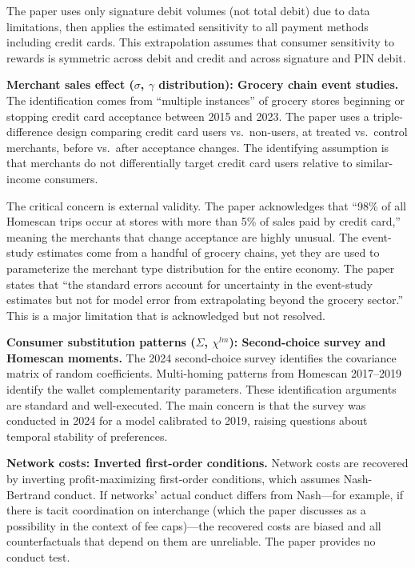 \documentclass[11pt]{article}
\begin{document}
The paper uses only signature debit volumes (not total debit) due to data limitations, then applies the estimated sensitivity to all payment methods including credit cards. This extrapolation assumes that consumer sensitivity to rewards is symmetric across debit and credit and across signature and PIN debit.

\textbf{Merchant sales effect ($\sigma$, $\gamma$ distribution): Grocery chain event studies.} The identification comes from ``multiple instances'' of grocery stores beginning or stopping credit card acceptance between 2015 and 2023. The paper uses a triple-difference design comparing credit card users vs.\ non-users, at treated vs.\ control merchants, before vs.\ after acceptance changes. The identifying assumption is that merchants do not differentially target credit card users relative to similar-income consumers.

The critical concern is external validity. The paper acknowledges that ``98\% of all Homescan trips occur at stores with more than 5\% of sales paid by credit card,'' meaning the merchants that change acceptance are highly unusual. The event-study estimates come from a handful of grocery chains, yet they are used to parameterize the merchant type distribution for the entire economy. The paper states that ``the standard errors account for uncertainty in the event-study estimates but not for model error from extrapolating beyond the grocery sector.'' This is a major limitation that is acknowledged but not resolved.

\textbf{Consumer substitution patterns ($\Sigma$, $\chi^{lm}$): Second-choice survey and Homescan moments.} The 2024 second-choice survey identifies the covariance matrix of random coefficients. Multi-homing patterns from Homescan 2017--2019 identify the wallet complementarity parameters. These identification arguments are standard and well-executed. The main concern is that the survey was conducted in 2024 for a model calibrated to 2019, raising questions about temporal stability of preferences.

\textbf{Network costs: Inverted first-order conditions.} Network costs are recovered by inverting profit-maximizing first-order conditions, which assumes Nash-Bertrand conduct. If networks' actual conduct differs from Nash---for example, if there is tacit coordination on interchange (which the paper discusses as a possibility in the context of fee caps)---the recovered costs are biased and all counterfactuals that depend on them are unreliable. The paper provides no conduct test.
\end{document}
